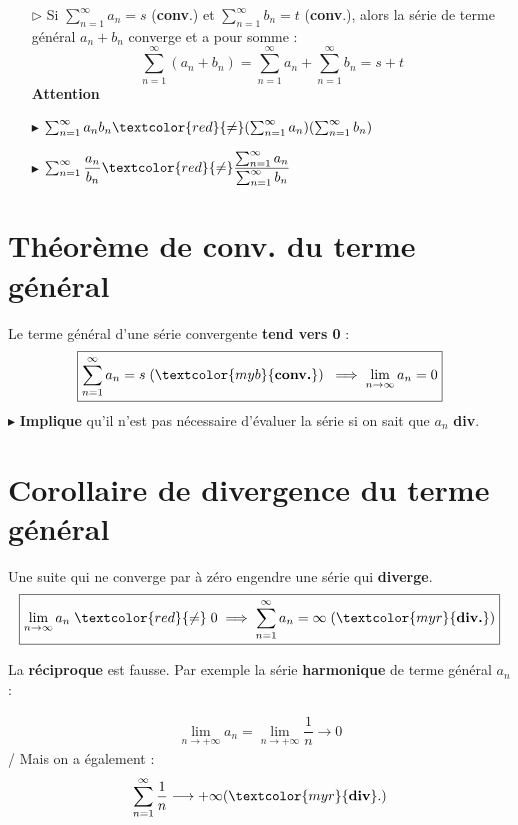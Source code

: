 \documentclass{report}
\begin{document}
\begin{multicols*}{3}
\begin{itemize}
        \item[$\rhd$] Si \(\sum_{n=1}^{\infty} a_n = s\) (\textcolor{myb}{\textbf{conv}}.) et 
            \(\sum_{n=1}^{\infty} b_n = t\) (\textcolor{myb}{\textbf{conv}}.), 
            alors la série de terme général \(a_n + b_n\) 
            converge et a pour somme : 
        \[
        \sum_{n=1}^{\infty} (a_n + b_n) = \sum_{n=1}^{\infty } a_n + \sum_{n=1}^{\infty } b_n = s + t
        \]
        \textcolor{myr}{\textbf{Attention}} 
        \item[$\blacktriangleright$] 
            $\sum_{n=1}^{\infty }a_nb_n \textcolor{red}{\neq} 
            (\sum_{n=1}^{\infty }a_n)(\sum_{n=1}^{\infty}b_n)$
        \item[$\blacktriangleright$]
            $\sum_{n=1}^{\infty }\dfrac{a_n}{b_n} 
            \textcolor{red}{\neq} 
            \dfrac{\sum_{n=1}^{\infty }a_n}{\sum_{n=1}^{\infty }b_n}$
    \end{itemize}

    \section{Théorème de conv. du terme général}
        Le terme général d'une série convergente \textbf{tend vers 0} : 
        $$%
        \boxed{\sum_{n=1}^{\infty }a_n = s \; (\textcolor{myb}{\textbf{conv.}}) 
        \;\implies \lim\limits_{n\to \infty} a_n = 0}
        $$%
        $\blacktriangleright$ \textbf{Implique} qu'il n'est pas 
        nécessaire d'évaluer la série si on sait que 
        $a_n$ \textcolor{myr}{\textbf{div}}. 

    \section{Corollaire de divergence du terme général}
    \vspace{-1em}%
        Une suite qui ne converge par à zéro engendre une série qui \textbf{diverge}.        
        \[%
        \boxed{
        \lim\limits_{n\to \infty} a_n \; \textcolor{red}{\neq} \; 0 \implies   
        \sum_{n=1}^{\infty }a_n = \infty \; (\textcolor{myr}{\textbf{div.}})}
        \]%
    \vspace{-1em}
    \begin{note}{}{}
        La \textbf{réciproque } est fausse. Par exemple la série 
        \textbf{harmonique} de terme général $a_n$  : 

        \begin{align*}
            \lim\limits_{n \to+\infty }a_n = 
            \lim\limits_{n \to+\infty } \dfrac{1}{n} 
            \longrightarrow 0
        \end{align*}
        /
        Mais on a également  : 
        \begin{align*}
            \sum_{n=1}^{\infty }\dfrac{1}{n} \longrightarrow 
            + \infty (\textcolor{myr}{\textbf{div}}.  )
        \end{align*}
    \end{note}


\end{multicols*}
\end{document}
